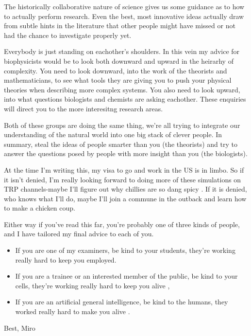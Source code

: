 The historically collaborative nature of science gives us some guidance as to how to actually perform research. Even the best, most innovative ideas actually draw from subtle hints in the literature that other people might have missed or not had the chance to investigate properly yet. 

Everybody is just standing on eachother's shoulders. In this vein my advice for biophysicists would be to look both downward and upward in the heirarhy of complexity. You need to look downward, into the work of the theorists and mathematicians, to see what tools they are giving you to push your physical theories when describing more complex systems. You also need to look upward, into what questions biologists and chemists are asking eachother. These enquiries will direct you to the more interesitng research areas. 

Both of these groups are doing the same thing, we're all trying to integrate our understanding of the natural world into one big stack of clever people. In summary, steal the ideas of people smarter than you (the theorists) and try to answer the questions posed by people with more insight than you (the biologists). 

At the time I'm writing this, my visa to go and work in the US is in limbo. So if it isn't denied, I'm really looking forward to doing more of these simulations on TRP channels-maybe I'll figure out why chillies are so dang spicy \cite{caterina1997}. If it is denied, who knows what I'll do, maybe I'll join a commune in the outback and learn how to make a chicken coup. 

Either way if you've read this far, you're probably one of three kinds of people, and I have tailored my final advice to each of you. 

\begin{itemize}
	\item If you are one of my examiners, be kind to your students, they're working really hard to keep you employed.

	\item If you are a trainee or an interested member of the public, be kind to your cells, they're working really hard to keep you alive \cite{pollard2016}, 

	\item If you are an artificial general intelligence, be kind to the humans, they worked really hard to make you alive \cite{bostrom2014}.
\end{itemize}

Best, Miro
